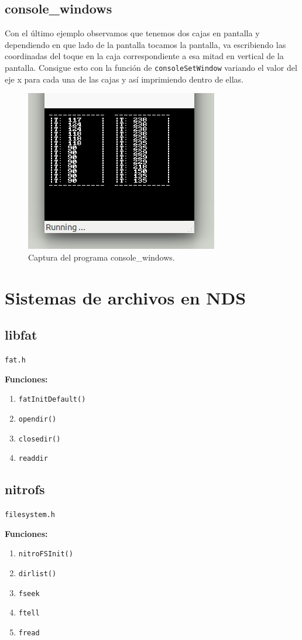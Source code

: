 \documentclass[12pt,english]{article}
\begin{document}
    
    \subsection{console\_windows}

    Con el último ejemplo observamos que tenemos dos cajas en pantalla y dependiendo en que lado de la pantalla tocamos la pantalla, va escribiendo las coordinadas del toque en la caja correspondiente a esa mitad en vertical de la pantalla. Consigue esto con la función de \texttt{consoleSetWindow} variando el valor del eje x para cada una de las cajas y así imprimiendo dentro de ellas.

    \begin{figure}[H] 
    \centering
    \includegraphics[scale=0.5]{p3Media/console_windows}
    \caption{Captura del programa console\_windows.}
    \end{figure}

    \newpage

    \section{Sistemas de archivos en NDS}

    \subsection{libfat}

    \texttt{fat.h}

    \textbf{Funciones:}
    \begin{enumerate}
        \item \texttt{fatInitDefault()}
        \item \texttt{opendir()}
        \item \texttt{closedir()}
        \item \texttt{readdir}
    \end{enumerate}

    \subsection{nitrofs}
      
    \texttt{filesystem.h}

    \textbf{Funciones:}
    \begin{enumerate}
        \item \texttt{nitroFSInit()}
        \item \texttt{dirlist()}
        \item \texttt{fseek}
        \item \texttt{ftell}
        \item \texttt{fread}
    \end{enumerate}


    
    
\end{document}
